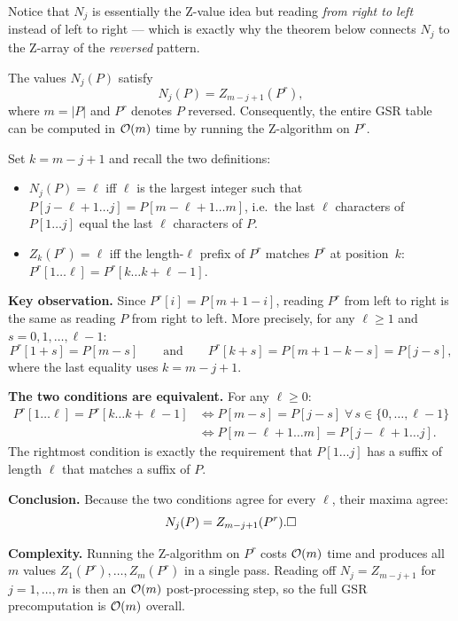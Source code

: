 Notice that $N_j$ is essentially the Z-value idea but reading
\emph{from right to left} instead of left to right --- which is exactly
why the theorem below connects $N_j$ to the Z-array of the
\emph{reversed} pattern.

\begin{theorem}
  The values $N_j(P)$ satisfy
  \[
    N_j(P) = Z_{m-j+1}(P^r),
  \]
  where $m = |P|$ and $P^r$ denotes $P$ reversed.
  Consequently, the entire GSR table can be computed in $\mathcal{O}\!\left(m\right)$ time by
  running the Z-algorithm on $P^r$.
\end{theorem}

\begin{formaldetails}[{Proof: $N_j(P) = Z_{m-j+1}(P^r)$}]
  Set $k = m - j + 1$ and recall the two definitions:
  \begin{itemize}[leftmargin=1.5em]
    \item $N_j(P) = \ell$ iff $\ell$ is the largest integer such that
          $P[j{-}\ell{+}1 \ldots j] = P[m{-}\ell{+}1 \ldots m]$,
          i.e.\ the last $\ell$ characters of $P[1\ldots j]$ equal the
          last $\ell$ characters of $P$.
    \item $Z_k(P^r) = \ell$ iff the length-$\ell$ prefix of $P^r$
          matches $P^r$ at position~$k$:
          $P^r[1\ldots\ell] = P^r[k\ldots k{+}\ell{-}1]$.
  \end{itemize}

  \smallskip
  \textbf{Key observation.}
  Since $P^r[i] = P[m+1-i]$, reading $P^r$ from left to right is
  the same as reading $P$ from right to left.
  More precisely, for any $\ell \geq 1$ and $s = 0,1,\ldots,\ell-1$:
  \[
    P^r[1+s] = P[m - s]
    \qquad\text{and}\qquad
    P^r[k+s] = P[m+1-k-s] = P[j - s],
  \]
  where the last equality uses $k = m - j + 1$.

  \smallskip
  \textbf{The two conditions are equivalent.}
  For any $\ell \geq 0$:
  \begin{align*}
    P^r[1\ldots\ell] = P^r[k\ldots k{+}\ell{-}1]
    &\iff P[m{-}s] = P[j{-}s]
          \;\forall\, s \in \{0,\ldots,\ell{-}1\} \\
    &\iff P[m{-}\ell{+}1\ldots m] = P[j{-}\ell{+}1\ldots j].
  \end{align*}
  The rightmost condition is exactly the requirement that
  $P[1\ldots j]$ has a suffix of length $\ell$ that matches a suffix of $P$.

  \smallskip
  \textbf{Conclusion.}
  Because the two conditions agree for every $\ell$, their maxima agree:
  \[
    N_j(P) = Z_{m-j+1}(P^r). \hfill\square
  \]

  \lprulesep

  \textbf{Complexity.}
  Running the Z-algorithm on $P^r$ costs $\mathcal{O}\!\left(m\right)$ time and produces all
  $m$ values $Z_1(P^r), \ldots, Z_m(P^r)$ in a single pass.
  Reading off $N_j = Z_{m-j+1}$ for $j = 1,\ldots,m$ is then an
  $\mathcal{O}\!\left(m\right)$ post-processing step, so the full GSR precomputation is
  $\mathcal{O}\!\left(m\right)$ overall.
\end{formaldetails}

